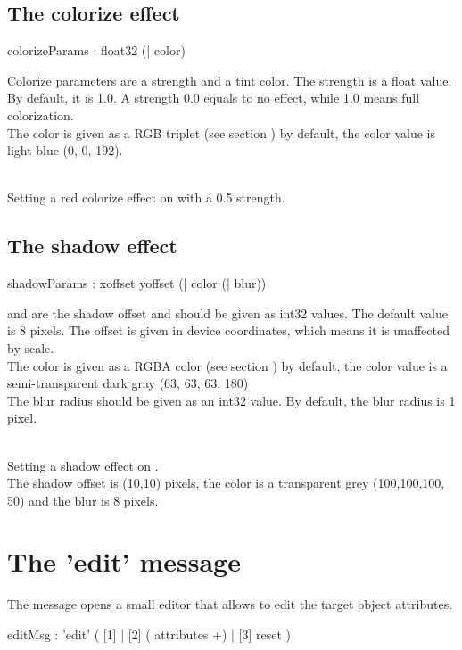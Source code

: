 \documentclass[a4paper,twoside]{report}
\newcommand{\sublevel}[1]	{\section{#1}}
\newcommand{\subsublevel}[1]	{\subsection{#1}}
\begin{document}
\subsublevel{The colorize effect}
\label{ecolorize}

\begin{rail}
colorizeParams : float32 (| color)
\end{rail}

Colorize parameters are a strength and a tint color. The strength is a float value. By default, it is 1.0. A strength 0.0 equals to no effect, while 1.0 means full colorization. \\
The color is given as a RGB triplet (see section ) by default, the color value is light blue (0, 0, 192).

\example \\
Setting a red colorize effect on  with a 0.5 strength.


\subsublevel{The shadow effect}
\label{eshadow}

\begin{rail}
shadowParams : xoffset yoffset (| color (| blur))
\end{rail}

 and  are the shadow offset and should be given as int32 values. The default value is 8 pixels. The offset is given in device coordinates, which means it is unaffected by scale. \\
The color is given as a RGBA color (see section ) by default, the color value is a semi-transparent dark gray (63, 63, 63, 180) \\
The blur radius should be given as an int32 value. By default, the blur radius is 1 pixel.

\example \\
Setting a shadow effect on . \\
The shadow offset is (10,10) pixels, the color is a transparent grey (100,100,100, 50) and the blur is 8 pixels.

\sublevel{The 'edit' message}
\label{editmsg}

The  message opens a small editor that allows to edit the target object attributes.


\begin{rail}
editMsg : 'edit' ( [1] | 
					 [2] ( attributes +) |
					 [3] reset )
\end{rail}
\end{document}
